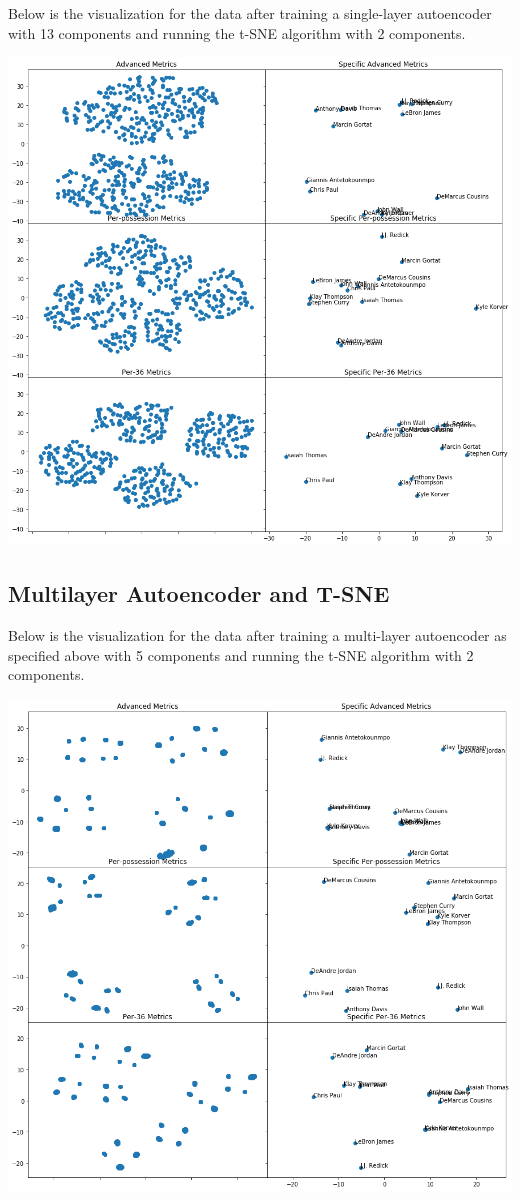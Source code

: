 \documentclass[12pt]{article}
\begin{document}
    Below is the visualization for the data after training a single-layer autoencoder with 13 components and running the t-SNE algorithm with 2 components.
    \begin{center}
        \includegraphics[scale=0.5]{images/single-layer-13}
    \end{center}
    \subsection{Multilayer Autoencoder and T-SNE}
    Below is the visualization for the data after training a multi-layer autoencoder as specified above with 5 components and running the t-SNE algorithm with 2 components.
    \begin{center}
        \includegraphics[scale=0.5]{images/multi-layer}
    \end{center}
\end{document}
